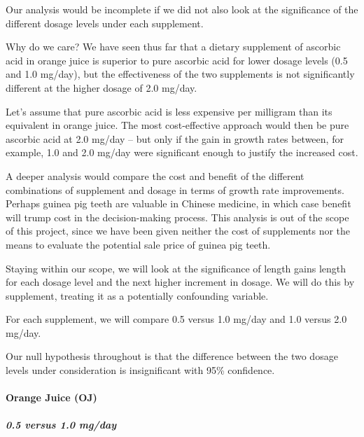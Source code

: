 \documentclass[]{article}
\newenvironment{Shaded}{\begin{snugshade}}{\end{snugshade}}
\newcommand{\KeywordTok}[1]{\textcolor[rgb]{0.13,0.29,0.53}{\textbf{#1}}}
\newcommand{\FloatTok}[1]{\textcolor[rgb]{0.00,0.00,0.81}{#1}}
\newcommand{\StringTok}[1]{\textcolor[rgb]{0.31,0.60,0.02}{#1}}
\newcommand{\OperatorTok}[1]{\textcolor[rgb]{0.81,0.36,0.00}{\textbf{#1}}}
\newcommand{\NormalTok}[1]{#1}
\let\oldparagraph\paragraph
\renewcommand{\paragraph}[1]{\oldparagraph{#1}\mbox{}}
\let\oldsubparagraph\subparagraph
\renewcommand{\subparagraph}[1]{\oldsubparagraph{#1}\mbox{}}
\begin{document}
Our analysis would be incomplete if we did not also look at the
significance of the different dosage levels under each supplement.

Why do we care? We have seen thus far that a dietary supplement of
ascorbic acid in orange juice is superior to pure ascorbic acid for
lower dosage levels (0.5 and 1.0 mg/day), but the effectiveness of the
two supplements is not significantly different at the higher dosage of
2.0 mg/day.

Let's assume that pure ascorbic acid is less expensive per milligram
than its equivalent in orange juice. The most cost-effective approach
would then be pure ascorbic acid at 2.0 mg/day -- but only if the gain
in growth rates between, for example, 1.0 and 2.0 mg/day were
significant enough to justify the increased cost.

A deeper analysis would compare the cost and benefit of the different
combinations of supplement and dosage in terms of growth rate
improvements. Perhaps guinea pig teeth are valuable in Chinese medicine,
in which case benefit will trump cost in the decision-making process.
This analysis is out of the scope of this project, since we have been
given neither the cost of supplements nor the means to evaluate the
potential sale price of guinea pig teeth.

Staying within our scope, we will look at the significance of length
gains length for each dosage level and the next higher increment in
dosage. We will do this by supplement, treating it as a potentially
confounding variable.

For each supplement, we will compare 0.5 versus 1.0 mg/day and 1.0
versus 2.0 mg/day.

Our null hypothesis throughout is that the difference between the two
dosage levels under consideration is insignificant with 95\% confidence.

\paragraph{Orange Juice (OJ)}\label{orange-juice-oj}

\subparagraph{0.5 versus 1.0 mg/day}\label{versus-1.0-mgday}

\begin{Shaded}
\end{Shaded}
\end{document}
